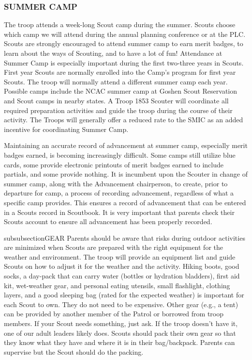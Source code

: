 \documentclass{ltxguide}
\begin{document}
\subsubsection{SUMMER CAMP}
The troop attends a week-long Scout camp during the summer. Scouts choose which camp we will attend during the annual planning conference or at the \ac{PLC}. Scouts are strongly encouraged to attend summer camp to earn merit badges, to learn about the ways of Scouting, and to have a lot of fun! Attendance at Summer Camp is especially important during the first two-three years in Scouts. First year Scouts are normally enrolled into the Camp's program for first year Scouts. The troop will normally attend a different summer camp each year. Possible camps include the \ac{NCAC} summer camp at Goshen Scout Reservation and Scout camps in nearby states. A Troop 1853 Scouter will coordinate all required preparation activities and guide the troop during the course of their activity. The Troops will generally offer a reduced rate to the SMIC as an added incentive for coordinating Summer Camp. 

Maintaining an accurate record of advancement at summer camp, especially merit badges earned, is becoming increasingly difficult. Some camps still utilize blue cards, some provide electronic printouts of merit badges earned to include partials, and some provide nothing. It is incumbent upon the Scouter in change of summer camp, along with the Advancement chairperson, to create, prior to departure for camp, a process of recording advancement, regardless of what a specific camp provides. This ensures a record of advancement that can be entered in a Scouts record in Scoutbook. It is very important that parents check their Scouts account to ensure all advancement has been properly recorded.

subsubsection{GEAR}
Parents should be aware that risks during outdoor activities are minimized when Scouts are prepared with the right equipment for the weather and environment. The troop will provide an equipment list and guide Scouts on how to adjust it for the weather and the activity. Hiking boots, good socks, a day-pack that can carry water (bottles or hydration bladders), first aid kit, wet-weather gear, and personal eating utensils, small flashlight, clothing layers, and a good sleeping bag (rated for the expected weather) is important for each Scout to own. They do not need to be expensive. Other gear (e.g., a tent) can be provided by another member of the Patrol or borrowed from troop members. If your Scout needs something, just ask. If the troop doesn't have it, one of our adult leaders likely does. Scouts should pack their own gear so that they know what they have and where it is in their bag/backpack. Parents can supervise but the Scout should do the packing. 
\end{document}
